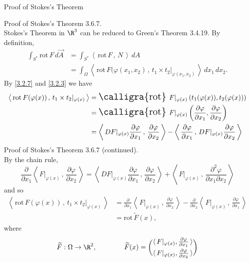 \documentclass[smaller,hyperref={CJKbookmarks=true}]{beamer}
\newcommand{\scp}[2]{\left\langle\,#1\,,\,#2\,\right\rangle} \newcommand{\scpp}{\langle\,\cdot\,,\,\cdot\,\rangle}
\newcommand{\rot}{\text{\Large{\calligra{rot}}\,}}
\begin{document}
\begin{frame}{Proof of Stokes's Theorem}
\begin{spacing}{1}
\alert{Proof of Stokes's Theorem 3.6.7.}\\
Stokes's Theorem in $\R^3$ can be reduced to Green's Theorem 3.4.19. By definition,
\begin{equation*}
  \begin{split}
     \int_{S^*}\text{rot}\,F\,d\vec{A} &=\int_{S^*}\scp{\text{rot}\,F}{N}\,dA \\
       &=\int_\Omega\scp{\text{rot}\,F(\varphi(x_1,x_2)}{t_1\times t_2|_{\varphi(x_1,x_2)}}\,dx_1\,dx_2.
  \end{split}
\end{equation*}
By \eqref{3.2.7} and \eqref{3.2.3} we have
\begin{equation*}
  \begin{split}
     \scp{\text{rot}\,F(\varphi(x))}{t_1\times t_2|_{\varphi(x)}} &=\rot\,F|_{\varphi(x)}\left(t_1(\varphi(x)),t_2(\varphi(x))\right) \\
       &=\rot\,F|_{\varphi(x)}\left(\frac{\partial\varphi}{\partial x_1},\frac{\partial\varphi}{\partial x_2}\right) \\
       &=\scp{DF|_{\varphi(x)}\frac{\partial\varphi}{\partial x_1}}{\frac{\partial\varphi}{\partial x_2}}-\scp{\frac{\partial\varphi}{\partial x_1}}{DF|_{\varphi(x)}\frac{\partial\varphi}{\partial x_2}}
  \end{split}
\end{equation*}
\newpage
\alert{Proof of Stokes's Theorem 3.6.7 (continued).}\\
By the chain rule,
\[\frac{\partial}{\partial x_1}\scp{F|_{\varphi(x)}}{\frac{\partial\varphi}{\partial x_2}}=\scp{DF|_{\varphi(x)}\frac{\partial\varphi}{\partial x_1}}{\frac{\partial\varphi}{\partial x_2}}+\scp{F|_{\varphi(x)}}{\frac{\partial^2\varphi}{\partial x_1\partial x_2}}\]
and so
\begin{equation*}
  \begin{split}
     \scp{\text{rot}\,F(\varphi(x))}{t_1\times t_2|_{\varphi(x)}} &=\frac{\partial}{\partial x_1}\scp{F|_{\varphi(x)}}{\frac{\partial\varphi}{\partial x_2}}-\frac{\partial}{\partial x_2}\scp{F|_{\varphi(x)}}{\frac{\partial\varphi}{\partial x_1}} \\
       &=\text{rot}\,\widetilde{F}(x),
  \end{split}
\end{equation*}
where
\[\widetilde{F}:\Omega\to\R^2,\qquad\qquad
\widetilde{F}(x)=\binom{\langle\,F|_{\varphi(x)},\frac{\partial\varphi}{\partial x_1}\,\rangle}{\langle\,F|_{\varphi(x)},\frac{\partial\varphi}{\partial x_2}\,\rangle}\]

\end{spacing}
\end{frame}
\end{document}
